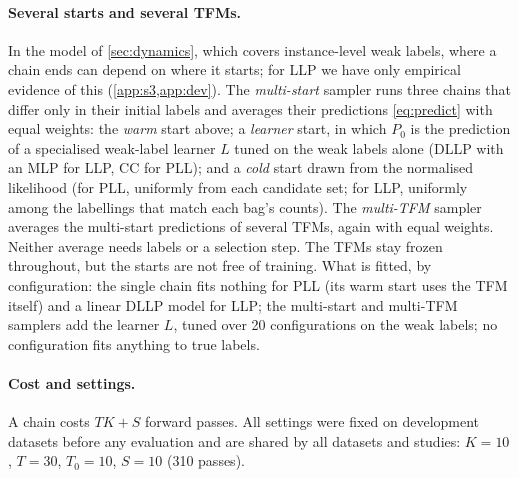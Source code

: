 \paragraph{Several starts and several TFMs.} In the model of \cref{sec:dynamics}, which covers instance-level weak
labels, where a chain ends can depend on where it starts; for LLP we have only empirical evidence of this
(\cref{app:s3,app:dev}). The \emph{multi-start} sampler runs three chains that differ only in their initial labels and averages their
predictions \eqref{eq:predict} with equal weights: the \emph{warm} start above; a \emph{learner} start, in which $P_0$ is
the prediction of a specialised weak-label learner $L$ tuned on the weak labels alone (DLLP with an MLP for LLP, CC
\citep{feng2020provably} for PLL); and a \emph{cold} start drawn from the normalised likelihood (for PLL, uniformly from each candidate set; for LLP,
uniformly among the labellings that match each bag's counts). The \emph{multi-TFM}
sampler averages the multi-start predictions of several TFMs, again with equal weights. Neither average needs labels
or a selection step. The TFMs stay frozen throughout, but the starts are not free of training. What is fitted, by
configuration: the single chain fits nothing for PLL (its warm start uses the TFM itself) and a linear DLLP model for
LLP; the multi-start and multi-TFM samplers add the learner $L$, tuned over 20 configurations on the weak labels; no
configuration fits anything to true labels.

\paragraph{Cost and settings.} A chain costs $TK+S$ forward passes. All settings were fixed on development datasets
before any evaluation and are shared by all datasets and studies: $K=10$, $T=30$, $T_0=10$, $S=10$ (310 passes).
